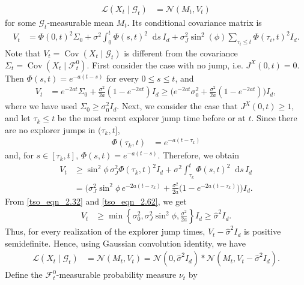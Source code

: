 \documentclass{article}
\newcommand*\der{\mathop{}\!\mathrm{d}}
\numberwithin{equation}{section}
\begin{document}
\begin{align}
\mathcal L(X_t\mid\mathcal G_t) &= \mathcal N(M_t,V_t)
\end{align}
for some $\mathcal G_t$-measurable mean $M_t$. Its conditional covariance matrix is
\begin{align}
V_t &= \Phi(0,t)^2\Sigma_0 + \sigma^2\int_0^t\Phi(s,t)^2\der s\,I_d + \sigma_J^2\sin^2(\phi)\sum_{\tau_i\leq t}\Phi(\tau_i,t)^2I_d .
\end{align}
Note that $V_t=\operatorname{Cov}(X_t\mid\mathcal G_t)$ is different from the covariance $\Sigma_t=\operatorname{Cov}(X_t\mid\mathcal{F}^0_t)$. 
First consider the case with no jump, i.e. $J^X(0,t)=0$. Then $\Phi(s,t) = e^{-a(t-s)}$ 
for every $0\leq s\leq t$, and
\begin{align}\label{tso_eqn_2.32}
V_t &= e^{-2at}\Sigma_0 + \frac{\sigma^2}{2a} \left(1-e^{-2at}\right)I_d \geq \Big( e^{-2at}\sigma_0^2 + \frac{\sigma^2}{2a} \left(1-e^{-2at}\right) \Big)I_d, 
\end{align}
where we have used $\Sigma_0\geq\sigma_0^2I_d$. 
Next, we consider the case that $J^X(0,t)\geq1$, and let $\tau_k\leq t$ be the most recent explorer jump time before or at $t$. Since there are no explorer jumps in $(\tau_k,t]$,
\begin{align}
\Phi(\tau_k,t) &= e^{-a(t-\tau_k)}
\end{align}
and, for $s\in[\tau_k,t]$, $\Phi(s,t) = e^{-a(t-s)}$. Therefore, we obtain
\begin{align}\label{tso_eqn_2.62}
V_t & \geq \sin^2\phi\, \sigma_J^2\Phi(\tau_k,t)^2I_d + \sigma^2\int_{\tau_k}^t\Phi(s,t)^2\der s\,I_d  \nonumber \\  &   = \Big( \sigma_J^2\sin^2\phi\,e^{-2a(t-\tau_k)} + \frac{\sigma^2}{2a} \big(1-e^{-2a(t-\tau_k)}\big) \Big) I_d.
\end{align}
From \eqref{tso_eqn_2.32} and \eqref{tso_eqn_2.62}, we get
\begin{align*}
V_t &\geq \min\left\{ \sigma_0^2, \sigma_J^2\sin^2\phi, \frac{\sigma^2}{2a} \right\}I_d \geq \hat{\sigma}^2I_d .
\end{align*}
Thus, for every realization of the explorer jump times, $V_t-\hat{\sigma}^2I_d$ 
is positive semidefinite. Hence, using Gaussian convolution identity, we have
\begin{align*}
\mathcal L(X_t\mid\mathcal G_t) &= \mathcal{N}(M_t, V_t) = \mathcal N(0,\hat{\sigma}^2I_d) * \mathcal N(M_t,V_t-\hat{\sigma}^2I_d).
\end{align*}
Define the $\mathcal{F}^0_t$-measurable probability measure $\nu_t$ by
\end{document}
